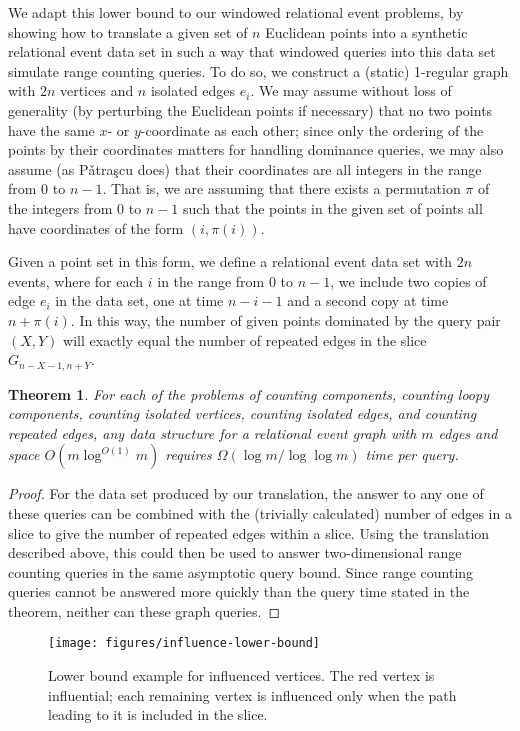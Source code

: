 \documentclass[11pt]{article}
\newtheorem{theorem}{Theorem}
\begin{document}
We adapt this lower bound to our windowed relational event problems, by showing how to translate a given set of $n$ Euclidean points into a synthetic relational event data set in such a way that windowed queries into this data set simulate range counting queries. To do so, we construct a (static) 1-regular graph with $2n$ vertices and $n$ isolated edges $e_i$. We may assume without loss of generality (by perturbing the Euclidean points if necessary) that no two points have the same $x$- or $y$-coordinate as each other; since only the ordering of the points by their coordinates matters for handling dominance queries, we may also assume (as P{\v a}tra{\c s}cu does) that their coordinates are all integers in the range from $0$ to $n-1$. That is, we are assuming that there exists a permutation $\pi$ of the integers from $0$ to $n-1$ such that the points in the given set of points all have coordinates of the form $(i,\pi(i))$.

Given a point set in this form, we define a relational event data set with $2n$ events, where for each $i$ in the range from $0$ to $n-1$, we include two copies of edge $e_i$ in the data set, one at time $n-i-1$ and a second copy at time $n+\pi(i)$. In this way, the number of given points dominated by the query pair $(X,Y)$ will exactly equal the number of repeated edges in the slice $G_{n-X-1,n+Y}$.

\begin{theorem}
\label{thm:lb}
For each of the problems of counting components, counting loopy components, counting isolated vertices, counting isolated edges, and counting repeated edges, any data structure for a relational event graph with $m$ edges and space $O(m\log^{O(1)} m)$ requires $\Omega(\log m/\log\log m)$ time per query.
\end{theorem}

\begin{proof}
For the data set produced by our translation, the answer to any one of these queries can be combined with the (trivially calculated) number of edges in a slice to give the number of repeated edges within a slice. Using the translation described above, this could then be used to answer two-dimensional range counting queries in the same asymptotic query bound. Since range counting queries cannot be answered more quickly than the query time stated in the theorem, neither can these graph queries.
\end{proof}

\begin{figure}[t]
\centering
\texttt{[image: figures/influence-lower-bound]}
\caption{Lower bound example for influenced vertices. The red vertex is influential; each remaining vertex is influenced only when the path leading to it is included in the slice.}
\label{fig:influence-lower-bound}
\end{figure}
\end{document}
